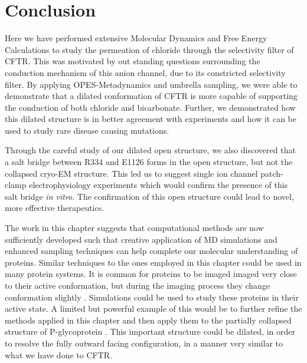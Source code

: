 
\section{Conclusion}
Here we have performed extensive Molecular Dynamics and Free Energy Calculations to study the permeation of chloride through the selectivity filter of CFTR. This was motivated by out standing questions surrounding the conduction mechanism of this anion channel, due to its constricted selectivity filter. By applying OPES-Metadynamics and umbrella sampling, we were able to demonstrate that a dilated conformation of CFTR is more capable of supporting the conduction of both chloride and bicarbonate. Further, we demonstrated how this dilated structure is in better agreement with experiments and how it can be used to study rare disease causing mutations.

Through the careful study of our dilated open structure, we also discovered that a salt bridge between R334 and E1126 forms in the open structure, but not the collapsed cryo-EM structure. This led us to suggest single ion channel patch-clamp electrophysiology experiments which would confirm the presence of this salt bridge \textit{in vitro}. The confirmation of this open structure could lead to novel, more effective therapeutics.

The work in this chapter suggests that computational methods are now sufficiently developed such that creative application of MD simulations and enhanced sampling techniques can help complete our molecular understanding of proteins. Similar techniques to the ones employed in this chapter could be used in many protein systems. It is common for proteins to be imaged imaged very close to their active conformation, but during the imaging process they change conformation slightly \cite{bock2022}. Simulations could be used to study these proteins in their active state. A limited but powerful example of this would be to further refine the methods applied in this chapter and then apply them to the partially collapsed structure of P-glycoprotein \cite{kim2018a}. This important structure could be dilated, in order to resolve the fully outward facing configuration, in a manner very similar to what we have done to CFTR.


